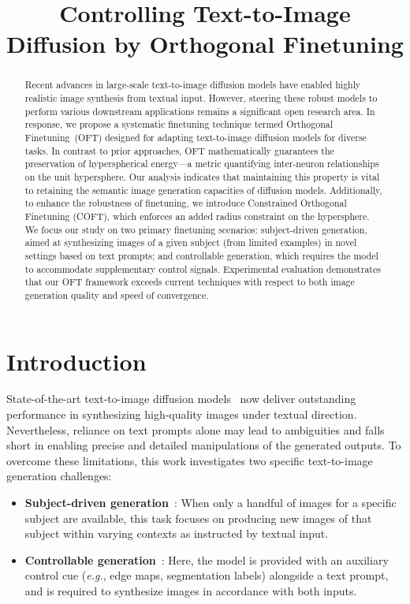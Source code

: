\title{Controlling Text-to-Image Diffusion by Orthogonal Finetuning}

\begin{abstract}
Recent advances in large-scale text-to-image diffusion models have enabled highly realistic image synthesis from textual input. However, steering these robust models to perform various downstream applications remains a significant open research area. In response, we propose a systematic finetuning technique termed Orthogonal Finetuning~(OFT) designed for adapting text-to-image diffusion models for diverse tasks. In contrast to prior approaches, OFT mathematically guarantees the preservation of hyperspherical energy—a metric quantifying inter-neuron relationships on the unit hypersphere. Our analysis indicates that maintaining this property is vital to retaining the semantic image generation capacities of diffusion models. Additionally, to enhance the robustness of finetuning, we introduce Constrained Orthogonal Finetuning (COFT), which enforces an added radius constraint on the hypersphere. We focus our study on two primary finetuning scenarios: subject-driven generation, aimed at synthesizing images of a given subject (from limited examples) in novel settings based on text prompts; and controllable generation, which requires the model to accommodate supplementary control signals. Experimental evaluation demonstrates that our OFT framework exceeds current techniques with respect to both image generation quality and speed of convergence.
\end{abstract}

\section{Introduction}

State-of-the-art text-to-image diffusion models~\cite{saharia2022photorealistic,ramesh2022hierarchical,rombach2022high} now deliver outstanding performance in synthesizing high-quality images under textual direction. Nevertheless, reliance on text prompts alone may lead to ambiguities and falls short in enabling precise and detailed manipulations of the generated outputs. To overcome these limitations, this work investigates two specific text-to-image generation challenges:

\begin{itemize}[leftmargin=*,nosep]

    \item \textbf{Subject-driven generation}~\cite{ruiz2023dreambooth}: When only a handful of images for a specific subject are available, this task focuses on producing new images of that subject within varying contexts as instructed by textual input.
    \item \textbf{Controllable generation}~\cite{zhang2023adding,mou2023t2i}: Here, the model is provided with an auxiliary control cue (\emph{e.g.}, edge maps, segmentation labels) alongside a text prompt, and is required to synthesize images in accordance with both inputs.
\end{itemize}

